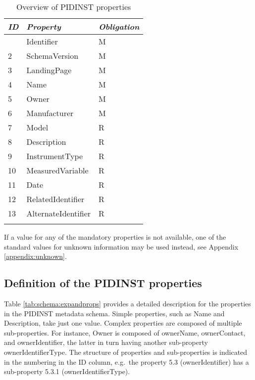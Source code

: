 \documentclass[titlepage=true,twoside=false,DIV=13]{scrartcl}
\begin{document}
\begin{longtable}{|l|l|l|}
  \hline
  \emph{ID} & \emph{Property} & \emph{Obligation} \\
  \hline \endhead
  \hline \endfoot\endlastfoot
  1     & Identifier          & M \\
  2     & SchemaVersion       & M \\
  3     & LandingPage         & M \\
  4     & Name                & M \\
  5     & Owner               & M \\
  6     & Manufacturer        & M \\
  7     & Model               & R \\
  8     & Description         & R \\
  9     & InstrumentType      & R \\
  10    & MeasuredVariable    & R \\
  11    & Date                & R \\
  12    & RelatedIdentifier   & R \\
  13    & AlternateIdentifier & R \\
  \hline
  \caption{Overview of PIDINST properties}
  \label{tab:schema:propoverview}
\end{longtable}

If a value for any of the mandatory properties is not available, one
of the standard values for unknown information may be used instead,
see Appendix \ref{appendix:unknown}.

\subsection{Definition of the PIDINST properties}

Table \ref{tab:schema:expandprops} provides a detailed description for
the properties in the PIDINST metadata schema.  Simple properties,
such as Name and Description, take just one value.  Complex properties
are composed of multiple sub-properties.  For instance, Owner is
composed of ownerName, ownerContact, and ownerIdentifier, the latter
in turn having another sub-property ownerIdentifierType.  The
structure of properties and sub-properties is indicated in the
numbering in the ID column, e.g.\ the property 5.3 (ownerIdentifier)
has a sub-property 5.3.1 (ownerIdentifierType).
\end{document}
